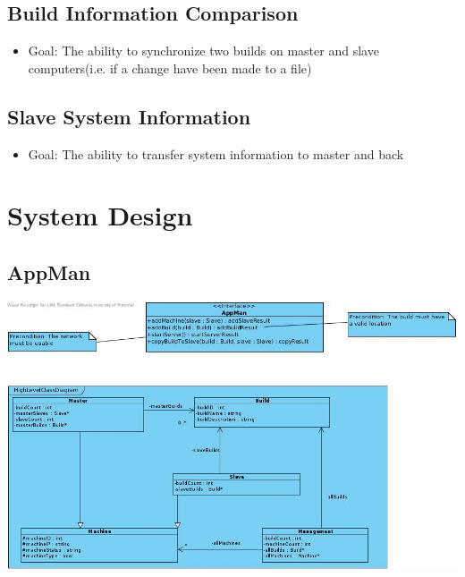 \documentclass[a4paper,12pt,final]{article}
\begin{document}
\subsection{Build Information Comparison}
\begin{itemize}
\item Goal: The ability to synchronize two builds on master and slave computers(i.e. if a change have been made to a file)
\end{itemize}
\subsection{Slave System Information}
\begin{itemize}
\item Goal: The ability to transfer system information to master and back
\end{itemize}


\section{System Design}
\subsection{AppMan}

\begin{center}
\includegraphics[scale=0.5]{AppManDiagram.jpg} 
\end{center}
\end{document}
